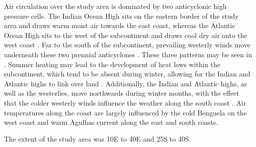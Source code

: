 \documentclass[a4paper,10pt,review]{elsarticle}
\begin{document}
Air circulation over the study area is dominated by two anticyclonic high pressure cells. The Indian Ocean High sits on the eastern border of the study area and draws warm moist air towards the east coast, whereas the Atlantic Ocean High sits to the west of the subcontinent and draws cool dry air onto the west coast \citep{vanHeerden1998}. Far to the south of the subcontinent, prevailing westerly winds move underneath these two prennial anticyclones \citep{vanHeerden1998}. These three patterns may be seen in . Summer heating may lead to the development of heat lows within the subcontinent, which tend to be absent during winter, allowing for the Indian and Atlantic highs to link over land \citep{vanHeerden1998}. Additionally, the Indian and Atlantic highs, as well as the westerlies, move northwards during winter months, with the effect that the colder westerly winds influence the weather along the south coast \citep{vanHeerden1998}. Air temperatures along the coast are largely influenced by the cold Benguela on the west coast and warm Agulhas current along the east and south coasts.

The extent of the study area was 10\degree E to 40\degree E and 25\degree S to 40\degree S.
\end{document}

